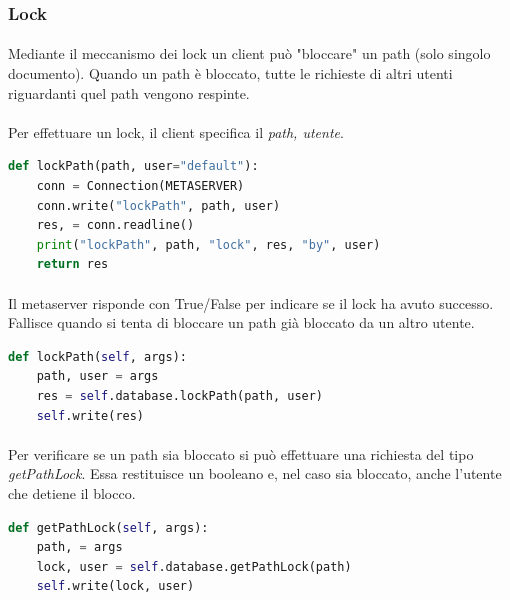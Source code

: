 \documentclass{article}
\begin{document}
\subsubsection{Lock}

\paragraph{} Mediante il meccanismo dei lock un client può "bloccare" un path (solo singolo documento). Quando un path è bloccato, tutte le richieste di altri utenti riguardanti quel path vengono respinte. 

\paragraph{} Per effettuare un lock, il client specifica il \emph{path, utente}. 

\begin{lstlisting}[language=Python, title=Client]
def lockPath(path, user="default"):
    conn = Connection(METASERVER)
    conn.write("lockPath", path, user)
    res, = conn.readline()
    print("lockPath", path, "lock", res, "by", user)
    return res
\end{lstlisting}

\paragraph{} Il metaserver risponde con True/False per indicare se il lock ha avuto successo. Fallisce quando si tenta di bloccare un path già bloccato da un altro utente.

\begin{lstlisting}[language=Python, title=Metaserver]
def lockPath(self, args):
    path, user = args
    res = self.database.lockPath(path, user)
    self.write(res)
\end{lstlisting}

\paragraph{} Per verificare se un path sia bloccato si può effettuare una richiesta del tipo \emph{getPathLock}. Essa restituisce un booleano e, nel caso sia bloccato, anche l'utente che detiene il blocco.

\begin{lstlisting}[language=Python, title=Metaserver]
def getPathLock(self, args):
    path, = args
    lock, user = self.database.getPathLock(path)
    self.write(lock, user)
\end{lstlisting}
\end{document}
